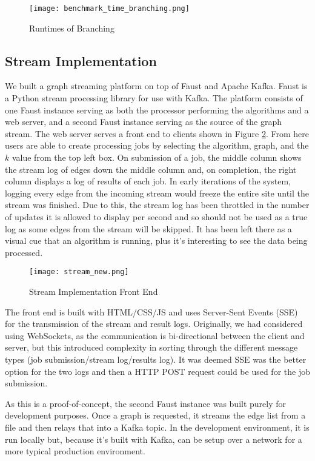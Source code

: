 \begin{figure}[H]
    \centering
    \texttt{[image: benchmark\_time\_branching.png]}
    \caption{Runtimes of Branching}
    \label{fig:benchmark_time_branching}
\end{figure}

\subsection{Stream Implementation}

We built a graph streaming platform on top of Faust and Apache Kafka.
Faust is a Python stream processing library for use with Kafka. The
platform consists of one Faust instance serving as both the processor
performing the algorithms and a web server, and a second Faust instance
serving as the source of the graph stream. The web server serves a front
end to clients shown in Figure \ref{fig:stream_font_end}. From here users are able to create
processing jobs by selecting the algorithm, graph, and the \(k\) value
from the top left box. On submission of a job, the middle column shows
the stream log of edges down the middle column and, on completion, the
right column displays a log of results of each job. In early iterations
of the system, logging every edge from the incoming stream would freeze
the entire site until the stream was finished. Due to this, the stream
log has been throttled in the number of updates it is allowed to display
per second and so should not be used as a true log as some edges from
the stream will be skipped. It has been left there as a visual cue that
an algorithm is running, plus it's interesting to see the data being
processed.

\begin{figure}[htb]
    \centering
    \texttt{[image: stream\_new.png]}
    \caption{Stream Implementation Front End}
    \label{fig:stream_font_end}
\end{figure}

The front end is built with HTML/CSS/JS and uses Server-Sent Events
(SSE) for the transmission of the stream and result logs. Originally, we
had considered using WebSockets, as the communication is bi-directional
between the client and server, but this introduced complexity in sorting
through the different message types (job submission/stream log/results
log). It was deemed SSE was the better option for the two logs and then
a HTTP POST request could be used for the job submission.

As this is a proof-of-concept, the second Faust instance was built
purely for development purposes. Once a graph is requested, it streams
the edge list from a file and then relays that into a Kafka topic. In
the development environment, it is run locally but, because it's built
with Kafka, can be setup over a network for a more typical production
environment.

